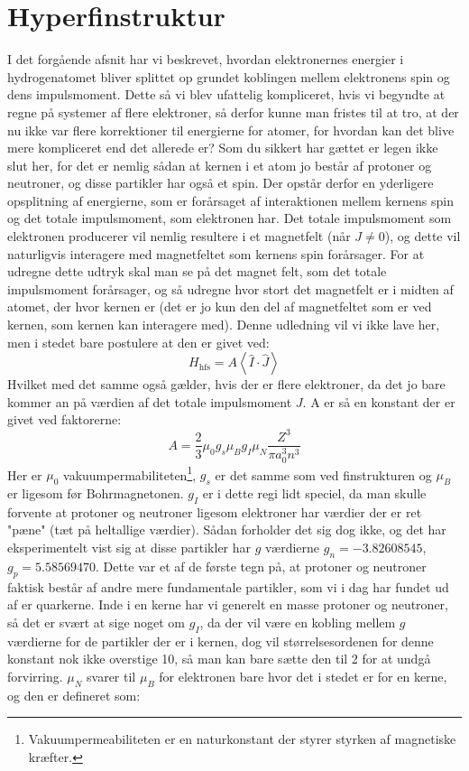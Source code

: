 \documentclass[../../Atom-ogMolekylefysik.tex]{subfiles}
\begin{document}
\section{Hyperfinstruktur}
I det forgående afsnit har vi beskrevet, hvordan elektronernes energier i hydrogenatomet bliver splittet op grundet koblingen mellem elektronens spin og dens impulsmoment. Dette så vi blev ufattelig kompliceret, hvis vi begyndte at regne på systemer af flere elektroner, så derfor kunne man fristes til at tro, at der nu ikke var flere korrektioner til energierne for atomer, for hvordan kan det blive mere kompliceret end det allerede er? Som du sikkert har gættet er legen ikke slut her, for det er nemlig sådan at kernen i et atom jo består af protoner og neutroner, og disse partikler har også et spin. Der opstår derfor en yderligere opsplitning af energierne, som er forårsaget af interaktionen mellem kernens spin og det totale impulsmoment, som elektronen har. Det totale impulsmoment som elektronen producerer vil nemlig resultere i et magnetfelt (når $J\neq0$), og dette vil naturligvis interagere med magnetfeltet som kernens spin forårsager. 
For at udregne dette udtryk skal man se på det magnet felt, som det totale impulsmoment forårsager, og så udregne hvor stort det magnetfelt er i midten af atomet, der hvor kernen er (det er jo kun den del af magnetfeltet som er ved kernen, som kernen kan interagere med). Denne udledning vil vi ikke lave her, men i stedet bare postulere at den er givet ved:
\begin{equation}
    H_\text{hfs}=A\left<\hat{I}\cdot\hat{J}\right>
\end{equation}
Hvilket med det samme også gælder, hvis der er flere elektroner, da det jo bare kommer an på værdien af det totale impulsmoment $J$.
A er så en konstant der er givet ved faktorerne:
\begin{equation}
A=\frac{2}{3}\mu_0g_s\mu_Bg_I\mu_N\frac{Z^3}{\pi a_0^3n^3}
\end{equation}
 Her er $\mu_0$ vakuumpermabiliteten\footnote{Vakuumpermeabiliteten er en naturkonstant der styrer styrken af magnetiske kræfter.}, $g_s$ er det samme som ved finstrukturen og $\mu_B$ er ligesom før Bohrmagnetonen. $g_I$ er i dette regi lidt speciel, da man skulle forvente at protoner og neutroner ligesom elektroner har værdier der er ret "pæne" (tæt på heltallige værdier). Sådan forholder det sig dog ikke, og det har eksperimentelt vist sig at disse partikler har $g$ værdierne $g_n=- 3.82608545$, $g_p=5.58569470$. Dette var et af de første tegn på, at protoner og neutroner faktisk består af andre mere fundamentale partikler, som vi i dag har fundet ud af er quarkerne. Inde i en kerne har vi generelt en masse protoner og neutroner, så det er svært at sige noget om $g_I$, da der vil være en kobling mellem $g$ værdierne for de partikler der er i kernen, dog vil størrelsesordenen for denne konstant nok ikke overstige 10, så man kan bare sætte den til 2 for at undgå forvirring. $\mu_N$ svarer til $\mu_B$ for elektronen bare hvor det i stedet er for en kerne, og den er defineret som:
\end{document}
